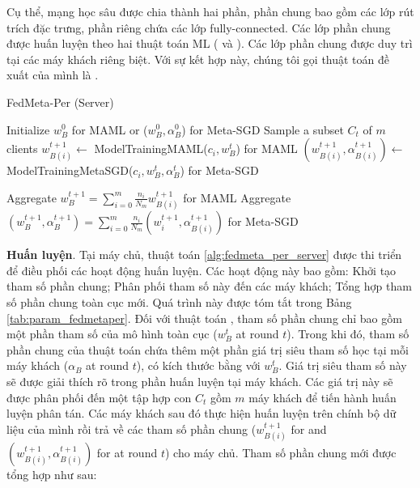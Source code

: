 \documentclass[runningheads]{llncs}
\begin{document}
Cụ thể, mạng học sâu được chia thành hai phần, phần chung bao gồm các lớp rút trích đặc trưng, phần riêng chứa các lớp fully-connected. Các lớp phần chung được huấn luyện theo hai thuật toán ML ( và ). Các lớp phần chung được duy trì tại các máy khách riêng biệt. Với sự kết hợp này, chúng tôi gọi thuật toán đề xuất của mình là .

\begin{algorithm}[h]
    \caption{FedMeta-Per (Server)} \label{alg:fedmeta_per_server}
    \begin{algorithmic}[1]
        \State Initialize $w_B^0$ for MAML or ($w_B^0, \alpha_B^0$) for Meta-SGD
            \State Sample a subset $C_t$ of $m$ clients
                \State $w_{B(i)}^{t+1} \gets$ ModelTrainingMAML($c_i, w_B^t$) for MAML
                \State $(w_{B(i)}^{t+1}, \alpha_{B(i)}^{t+1}) \gets$ ModelTrainingMetaSGD($c_i, w_B^t, \alpha_B^t$) for Meta-SGD
            \EndFor

            \State
            \State Aggregate $w_{B}^{t+1} = \sum_{i=0}^m \frac{n_i}{N_m} w_{B(i)}^{t+1}$ for MAML
            \State Aggregate $(w_B^{t+1}, \alpha_B^{t+1}) = \sum_{i=0}^m \frac{n_i}{N_m} (w_i^{t+1}, \alpha_{B(i)}^{t+1})$ for Meta-SGD
        \EndFor
    \end{algorithmic}
\end{algorithm}

\textbf{Huấn luyện}. Tại máy chủ, thuật toán \ref{alg:fedmeta_per_server} được thi triển để điều phối các hoạt động huấn luyện. Các hoạt động này bao gồm: Khởi tạo tham số phần chung; Phân phối tham số này đến các máy khách; Tổng hợp tham số phần chung toàn cục mới. Quá trình này được tóm tắt trong Bảng \ref{tab:param_fedmetaper}. Đối với thuật toán , tham số phần chung chỉ bao gồm một phần tham số của mô hình toàn cục ($w_B^t$ at round $t$). Trong khi đó, tham số phần chung của thuật toán  chứa thêm một phần giá trị siêu tham số học tại mỗi máy khách ($\alpha_B$ at round $t$), có kích thước bằng với $w_B^t$. Giá trị siêu tham số này sẽ được giải thích rõ trong phần huấn luyện tại máy khách. Các giá trị này sẽ được phân phối đến một tập hợp con $C_t$ gồm $m$ máy khách để tiến hành huấn luyện phân tán. Các máy khách sau đó thực hiện huấn luyện trên chính bộ dữ liệu của mình rồi trả về các tham số phần chung ($w_{B(i)}^{t+1}$ for  and $(w_{B(i)}^{t+1}, \alpha_{B(i)}^{t+1})$ for  at round $t$) cho máy chủ. Tham số phần chung mới được tổng hợp như sau:
\end{document}
